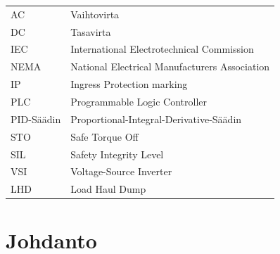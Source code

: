 \documentclass[finnish,12pt,a4paper,pdftex,elec,utf8]{aaltothesis}
\begin{document}
\begin{tabular}{ll}
AC         & Vaihtovirta \\
DC         & Tasavirta \\
IEC	       & International Electrotechnical Commission \\
NEMA       & National Electrical Manufacturers Association \\
IP		   & Ingress Protection marking \\
PLC		   & Programmable Logic Controller \\
PID-Säädin & Proportional-Integral-Derivative-Säädin \\
STO		   & Safe Torque Off \\
SIL		   & Safety Integrity Level \\
VSI		   & Voltage-Source Inverter \\
LHD		   & Load Haul Dump
\end{tabular}


\cleardoublepage
\storeinipagenumber
{}
\setcounter{page}{1}


\section{Johdanto}
\end{document}
